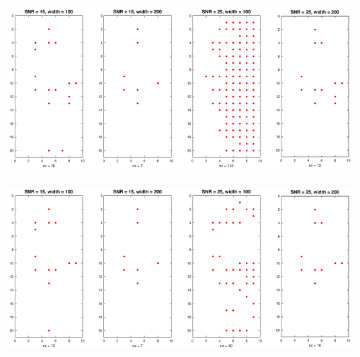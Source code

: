 \documentclass[12pt]{article}
\begin{document}
\begin{figure}
	\centering
	\begin{subfigure}[b]{0.75\textwidth}
        \includegraphics[width=\textwidth]{Figures/MDPfailures1D_F1_R20.eps}
        \caption{}
        \label{fig:MDPfailure_F1}
    \end{subfigure}
    \vspace{-5pt}
    
    \begin{subfigure}[b]{0.75\textwidth}
        \includegraphics[width=\textwidth]{Figures/MDPfailures1D_F2_R20.eps}
        \caption{}
        \label{fig:MDPfailure_F2}
    \end{subfigure} 


\end{figure}
\end{document}
